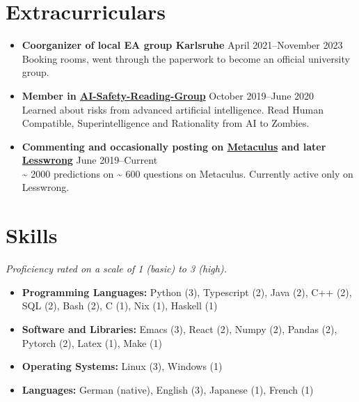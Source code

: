 \documentclass[letterpaper,10pt]{article}
\begin{document}
\ifdefined\EAVersion
\section*{Extracurriculars}
  \begin{itemize}
      \item {\textbf{Coorganizer of local EA group Karlsruhe}} \hfill April 2021--November 2023 \\
      {Booking rooms, went through the paperwork to become an official university group.}
      \item {\textbf{Member in \href{https://aisafety.com/}{AI-Safety-Reading-Group}}} \hfill October 2019--June 2020 \\
      {Learned about risks from advanced artificial intelligence. Read Human Compatible, Superintelligence and Rationality from AI to Zombies.}
      \item {\textbf{Commenting and occasionally posting on \href{https://www.metaculus.com/accounts/profile/106992/}{Metaculus} and later \href{https://www.lesswrong.com/users/morpheus}{Lesswrong}}} \hfill June 2019--Current \\
      {\textasciitilde{} 2000 predictions on \textasciitilde{} 600 questions on Metaculus. Currently active only on Lesswrong.}
  \end{itemize}
\fi

\unless\ifdefined\EAVersion
	\section*{Skills}
	\noindent\small\textit{Proficiency rated on a scale of 1 (basic) to 3 (high).}
	\normalsize
	\begin{itemize}
		\item \textbf{Programming Languages:} Python (3), Typescript (2), Java (2), C++ (2), SQL (2), Bash (2), C (1), Nix (1), Haskell (1)
		\item \textbf{Software and Libraries:} Emacs (3), React (2), Numpy (2), Pandas (2), Pytorch (2), Latex (1), Make (1)
		\item \textbf{Operating Systems:} Linux (3), Windows (1)
		\item \textbf{Languages:} German (native), English (3), Japanese (1), French (1)
	\end{itemize}
\fi
\end{document}
